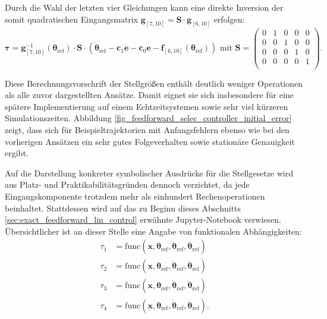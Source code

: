 Durch die Wahl der letzten vier Gleichungen kann eine direkte Inversion der somit quadratischen Eingangsmatrix $\mathbf{g}_{[7, 10]} = \mathbf{S} \cdot \mathbf{g}_{[6, 10]}$ erfolgen:
\begin{equation}
	\boldsymbol{\tau}= \mathbf{g}^{-1}_{[7, 10]}(\boldsymbol{\theta}_{\text{ref}}) \cdot \mathbf{S} \cdot (\ddot{\boldsymbol{\theta}}_{\text{ref}} - \mathbf{c}_{1} \mathbf{\dot{e}} - \mathbf{c}_{0} \mathbf{e} - \mathbf{f}_{[6, 10]}(\boldsymbol{\theta}_{\text{ref}})) \text{ mit } 
	\mathbf{S} = 
	\begin{pmatrix}
	0 & 1 & 0 & 0 & 0 \\
	0 & 0 & 1 & 0 & 0 \\
	0 & 0 & 0 & 1 & 0 \\
	0 & 0 & 0 & 0 & 1 \\
	\end{pmatrix}.
\end{equation}

Diese Berechnungsvorschrift der Stellgrößen enthält deutlich weniger Operationen als alle zuvor dargestellten Ansätze. Damit eignet sie sich insbesondere für eine spätere Implementierung auf einem Echtzeitsystemen sowie sehr viel kürzeren Simulationszeiten. Abbildung \ref{fig_feedforward_selec_controller_initial_error} zeigt, dass sich für Beispieltrajektorien mit Anfangsfehlern ebenso wie bei den vorherigen Ansätzen ein sehr gutes Folgeverhalten sowie stationäre Genauigkeit ergibt.

Auf die Darstellung konkreter symbolischer Ausdrücke für die Stellgesetze wird aus Platz- und Praktikabilitätsgründen dennoch verzichtet, da jede Eingangskomponente trotzdem mehr als einhundert Rechenoperationen beinhaltet. Stattdessen wird auf das zu Beginn dieses Abschnitts \ref{sec:exact_feedforward_lin_control} erwähnte Jupyter-Notebook verwiesen. Übersichtlicher ist an dieser Stelle eine Angabe von funktionalen Abhängigkeiten:
\begin{subequations}
	\begin{align}
		\tau_1 &= \mathrm{func}(\mathbf{x}, \boldsymbol{\theta}_{\mathrm{ref}}, \dot{\boldsymbol{\theta}}_{\mathrm{ref}}, \ddot{\boldsymbol{\theta}}_{\mathrm{ref}}) \\
		\tau_2 &= \mathrm{func}(\mathbf{x}, \boldsymbol{\theta}_{\mathrm{ref}}, \dot{\boldsymbol{\theta}}_{\mathrm{ref}}, \ddot{\boldsymbol{\theta}}_{\mathrm{ref}}) \\
		\tau_3 &= \mathrm{func}(\mathbf{x}, \boldsymbol{\theta}_{\mathrm{ref}}, \dot{\boldsymbol{\theta}}_{\mathrm{ref}}, \ddot{\boldsymbol{\theta}}_{\mathrm{ref}}) \\
		\tau_4 &= \mathrm{func}(\mathbf{x}, \boldsymbol{\theta}_{\mathrm{ref}}, \dot{\boldsymbol{\theta}}_{\mathrm{ref}}, \ddot{\boldsymbol{\theta}}_{\mathrm{ref}}).
	\end{align}
\end{subequations}

